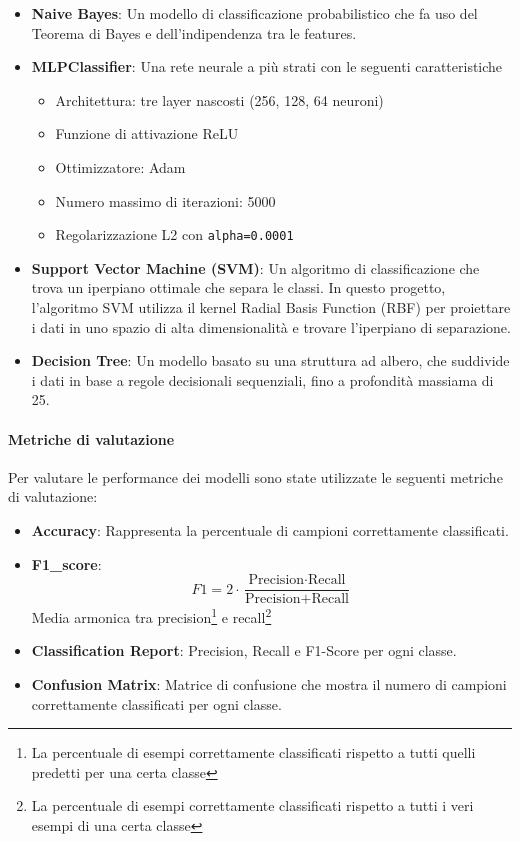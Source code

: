 \documentclass{article}
\begin{document}
\begin{itemize}
    \item \textbf{Naive Bayes}: Un modello di classificazione probabilistico che fa uso del 
    Teorema di Bayes e dell'indipendenza tra le features.  
    
    \item \textbf{MLPClassifier}: Una rete neurale a più strati con le seguenti caratteristiche
    
        \begin{itemize}
            \item Architettura: tre layer nascosti (256, 128, 64 neuroni)
            \item Funzione di attivazione ReLU
            \item Ottimizzatore: Adam
            \item Numero massimo di iterazioni: 5000
            \item Regolarizzazione L2 con \texttt{alpha=0.0001}
        \end{itemize}

    \item \textbf{Support Vector Machine (SVM)}: Un algoritmo di classificazione che trova un iperpiano 
    ottimale che separa le classi. In questo progetto, l'algoritmo SVM utilizza il kernel Radial Basis 
    Function (RBF) per proiettare i dati in uno spazio di alta dimensionalità e trovare l'iperpiano 
    di separazione.
    
    \item \textbf{Decision Tree}: Un modello basato su una struttura ad albero, che suddivide i dati in 
    base a regole decisionali sequenziali, fino a profondità massiama di 25. 
\end{itemize}

\paragraph{Metriche di valutazione}

Per valutare le performance dei modelli sono state utilizzate le seguenti metriche di valutazione: 
\begin{itemize}
    \item \textbf{Accuracy}: Rappresenta la percentuale di campioni correttamente classificati.
    \item \textbf{F1\_score}: \[F1 = 2 \cdot \frac{\text{Precision} \cdot 
                                    \text{Recall}}{\text{Precision} + \text{Recall}}\]
    Media armonica tra precision\footnote{La percentuale di esempi correttamente 
    classificati rispetto a tutti quelli predetti per una certa classe} e recall\footnote{La percentuale di 
    esempi correttamente classificati rispetto a tutti i veri esempi di una certa classe}
    \item \textbf{Classification Report}: Precision, Recall e F1-Score per ogni classe.
    \item \textbf{Confusion Matrix}: Matrice di confusione che mostra il numero di campioni correttamente 
    classificati per ogni classe.
\end{itemize}
\end{document}
